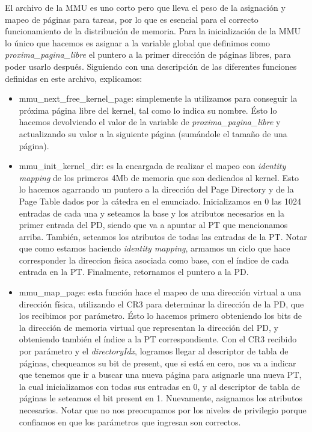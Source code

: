 El archivo de la MMU es uno corto pero que lleva el peso de la asignación y mapeo de páginas para
tareas, por lo que es esencial para el correcto funcionamiento de la distribución de memoria.
Para la inicialización de la MMU lo único que hacemos es asignar a la variable global
que definimos como \emph{proxima_pagina_libre} el puntero a la primer dirección de
páginas libres, para poder usarlo después.
Siguiendo con una descripción de las diferentes funciones definidas en este archivo, explicamos:
\begin{itemize}
    \item mmu_next_free_kernel_page: simplemente la utilizamos para conseguir la próxima página libre
    del kernel, tal como lo indica su nombre. Ésto lo hacemos devolviendo el valor de la variable de
    \emph{proxima_pagina_libre} y actualizando su valor a la siguiente página (sumándole el tamaño de una página).
    \item mmu_init_kernel_dir: es la encargada de realizar el mapeo con \emph{identity mapping} de los primeros 4Mb
    de memoria que son dedicados al kernel. Esto lo hacemos agarrando un puntero a la dirección del Page Directory y
    de la Page Table dados por la cátedra en el enunciado. Inicializamos en 0 las 1024 entradas de cada una
    y seteamos la base y los atributos necesarios en la primer entrada del PD, siendo que va a apuntar al PT que 
    mencionamos arriba. También, seteamos los atributos de todas las entradas de la PT. Notar que como estamos haciendo
    \emph{identity mapping}, armamos un ciclo que hace corresponder la direccion fisica asociada como base, con el índice
    de cada entrada en la PT. Finalmente, retornamos el puntero a la PD.
    \item mmu_map_page: esta función hace el mapeo de una dirección virtual a una dirección física, utilizando el CR3 para
    determinar la dirección de la PD, que los recibimos por parámetro. Ésto lo hacemos primero obteniendo los bits de la dirección
    de memoria virtual que representan la dirección del PD, y obteniendo también el índice a la PT correspondiente.
    Con el CR3 recibido por parámetro y el \emph{directoryIdx}, logramos llegar al descriptor de tabla de páginas, chequeamos su bit
    de present, que si está en cero, nos va a indicar que tenemos que ir a buscar una nueva página para asignarle una nueva PT, la cual
    inicializamos con todas sus entradas en 0, y al descriptor de tabla de páginas le seteamos el bit present en 1. Nuevamente, asignamos los atributos
    necesarios. Notar que no nos preocupamos por los niveles de privilegio porque confiamos en que los parámetros que ingresan son correctos.

\end{itemize}
